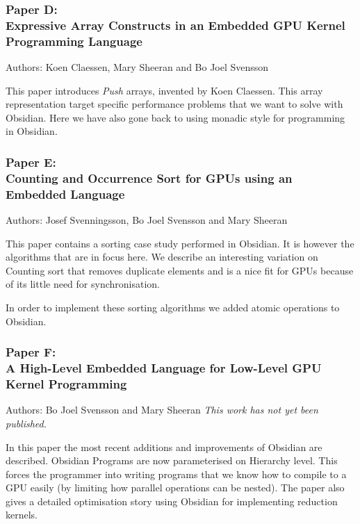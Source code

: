 \documentclass[a4paper]{book}
\newcommand{\paperD}{Paper D}
\newcommand{\paperDTitle}{Expressive Array Constructs in an Embedded GPU Kernel Programming Language}
\newcommand{\paperE}{Paper E}
\newcommand{\paperETitle}{Counting and Occurrence Sort for GPUs using an Embedded Language}
\newcommand{\paperF}{Paper F}
\newcommand{\paperFTitle}{A High-Level Embedded Language for Low-Level GPU Kernel Programming}
\begin{document}
\subsubsection{\paperD: \\ \paperDTitle}

Authors: Koen Claessen, Mary Sheeran and  Bo Joel Svensson \newline

\vspace{5mm}

This paper introduces {\em Push} arrays, invented by Koen Claessen. This 
array representation target specific performance problems that we want 
to solve with Obsidian. Here we have also gone back to using monadic 
style for programming in Obsidian. 


\subsubsection{\paperE: \\ \paperETitle} 

Authors: Josef Svenningsson, Bo Joel Svensson and Mary Sheeran \newline

\vspace{5mm}

This paper contains a sorting case study performed in Obsidian. It 
is however the algorithms that are in focus here. We describe 
an interesting variation on Counting sort that removes duplicate 
elements and is a nice fit for GPUs because of its little need for 
synchronisation. 

In order to implement these sorting algorithms we added atomic operations 
to Obsidian. 

\subsubsection{\paperF: \\ \paperFTitle}

Authors: Bo Joel Svensson and Mary Sheeran \newline
\noindent \emph{This work has not yet been published.}
\vspace{5mm} 

\noindent 

In this paper the most recent additions and improvements of Obsidian are 
described. Obsidian Programs are now parameterised on Hierarchy level. This forces 
the programmer into writing programs that we know how to compile to a GPU easily 
(by limiting how parallel operations can be nested). The paper also gives a detailed  
optimisation story using Obsidian for implementing reduction kernels. 
\end{document}
